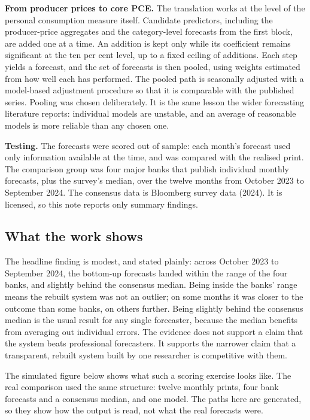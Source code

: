 \documentclass[
  british,
  a4paper,
]{article}
\begin{document}
\textbf{From producer prices to core PCE.} The translation works at the
level of the personal consumption measure itself. Candidate predictors,
including the producer-price aggregates and the category-level forecasts
from the first block, are added one at a time. An addition is kept only
while its coefficient remains significant at the ten per cent level, up
to a fixed ceiling of additions. Each step yields a forecast, and the
set of forecasts is then pooled, using weights estimated from how well
each has performed. The pooled path is seasonally adjusted with a
model-based adjustment procedure so that it is comparable with the
published series. Pooling was chosen deliberately. It is the same lesson
the wider forecasting literature reports: individual models are
unstable, and an average of reasonable models is more reliable than any
chosen one.

\textbf{Testing.} The forecasts were scored out of sample: each month's
forecast used only information available at the time, and was compared
with the realised print. The comparison group was four major banks that
publish individual monthly forecasts, plus the survey's median, over the
twelve months from October 2023 to September 2024. The consensus data is
Bloomberg survey data (2024). It is licensed, so this note reports only
summary findings.

\subsection{What the work shows}\label{what-the-work-shows}

The headline finding is modest, and stated plainly: across October 2023
to September 2024, the bottom-up forecasts landed within the range of
the four banks, and slightly behind the consensus median. Being inside
the banks' range means the rebuilt system was not an outlier; on some
months it was closer to the outcome than some banks, on others further.
Being slightly behind the consensus median is the usual result for any
single forecaster, because the median benefits from averaging out
individual errors. The evidence does not support a claim that the system
beats professional forecasters. It supports the narrower claim that a
transparent, rebuilt system built by one researcher is competitive with
them.

The simulated figure below shows what such a scoring exercise looks
like. The real comparison used the same structure: twelve monthly
prints, four bank forecasts and a consensus median, and one model. The
paths here are generated, so they show how the output is read, not what
the real forecasts were.
\end{document}

